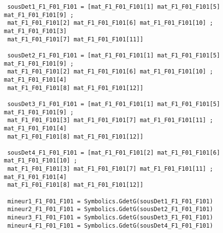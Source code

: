 \begin{lstlisting}
 sousDet1_F1_F01_F101 = [mat_F1_F01_F101[1] mat_F1_F01_F101[5] mat_F1_F01_F101[9] ;
 mat_F1_F01_F101[2] mat_F1_F01_F101[6] mat_F1_F01_F101[10] ; mat_F1_F01_F101[3]
 mat_F1_F01_F101[7] mat_F1_F01_F101[11]]

 sousDet2_F1_F01_F101 = [mat_F1_F01_F101[1] mat_F1_F01_F101[5] mat_F1_F01_F101[9] ;
 mat_F1_F01_F101[2] mat_F1_F01_F101[6] mat_F1_F01_F101[10] ; mat_F1_F01_F101[4]
 mat_F1_F01_F101[8] mat_F1_F01_F101[12]]

 sousDet3_F1_F01_F101 = [mat_F1_F01_F101[1] mat_F1_F01_F101[5] mat_F1_F01_F101[9] ;
 mat_F1_F01_F101[3] mat_F1_F01_F101[7] mat_F1_F01_F101[11] ; mat_F1_F01_F101[4]
 mat_F1_F01_F101[8] mat_F1_F01_F101[12]]

 sousDet4_F1_F01_F101 = [mat_F1_F01_F101[2] mat_F1_F01_F101[6] mat_F1_F01_F101[10] ;
 mat_F1_F01_F101[3] mat_F1_F01_F101[7] mat_F1_F01_F101[11] ; mat_F1_F01_F101[4]
 mat_F1_F01_F101[8] mat_F1_F01_F101[12]]
 
 mineur1_F1_F01_F101 = Symbolics.GdetG(sousDet1_F1_F01_F101)
 mineur2_F1_F01_F101 = Symbolics.GdetG(sousDet2_F1_F01_F101)
 mineur3_F1_F01_F101 = Symbolics.GdetG(sousDet3_F1_F01_F101)
 mineur4_F1_F01_F101 = Symbolics.GdetG(sousDet4_F1_F01_F101)
\end{lstlisting}

